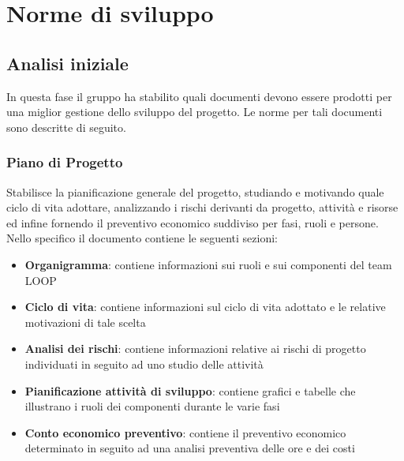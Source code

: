\documentclass[a4paper,11pt]{article}
\begin{document}
\newpage
\section{Norme di sviluppo}

\subsection{Analisi iniziale}
In questa fase il gruppo ha stabilito quali documenti devono essere prodotti per una miglior gestione dello sviluppo del progetto. Le norme per tali documenti sono descritte di seguito.

\subsubsection{Piano di Progetto}
Stabilisce la pianificazione generale del progetto, studiando e motivando quale ciclo di vita adottare, analizzando i rischi derivanti da progetto, attivit\`a e risorse ed infine fornendo il preventivo economico suddiviso per fasi, ruoli e persone. Nello specifico il documento contiene le seguenti sezioni: 
\begin{itemize}
\item \textbf{Organigramma}: contiene informazioni sui ruoli e sui componenti del team LOOP
\item \textbf{Ciclo di vita}: contiene informazioni sul ciclo di vita adottato e le relative motivazioni di tale scelta
\item \textbf{Analisi dei rischi}: contiene informazioni relative ai rischi di progetto individuati in seguito ad uno studio delle attivit\`a
\item \textbf{Pianificazione attivit\`a di sviluppo}: contiene grafici e tabelle che illustrano i ruoli dei componenti durante le varie fasi
\item \textbf{Conto economico preventivo}: contiene il preventivo economico determinato in seguito ad una analisi preventiva delle ore e dei costi
\end{itemize}
\end{document}
